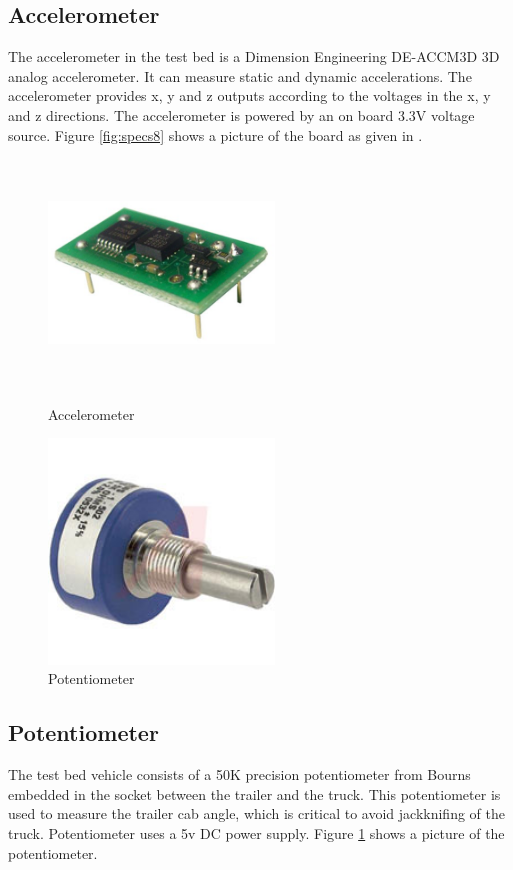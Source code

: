 \subsection{Accelerometer}
The accelerometer in the test bed is a Dimension Engineering DE-ACCM3D 3D analog accelerometer. It can measure static and dynamic accelerations. The accelerometer provides x, y and z outputs according to the voltages in the x, y and z directions. The accelerometer is powered by an on board 3.3V voltage source. Figure \ref{fig:specs8} shows a picture of the board as given in \cite{dhake2007real, woodley1999testbed}.

\begin{figure}[ht]
\begin{minipage}[b]{0.45\linewidth}
    \centering
    \includegraphics[width=6cm,height=6cm,keepaspectratio]{Pictures/acc.jpg}
    \caption{Accelerometer}
    \label{fig:specs8}
\end{minipage}
\begin{minipage}[b]{0.45\linewidth}
    \centering
    \includegraphics[width=6cm,height=6cm,keepaspectratio]{Pictures/pot.jpg}
    \caption{Potentiometer}
    \label{fig:specs9}
\end{minipage}
\end{figure}

\subsection{Potentiometer}
The test bed vehicle consists of a 50K precision potentiometer from Bourns embedded in the socket between the trailer and the truck. This potentiometer is used to measure the trailer cab angle, which is critical to avoid jackknifing of the truck. Potentiometer uses a 5v DC power supply. Figure \ref{fig:specs9} shows a picture of the potentiometer.


